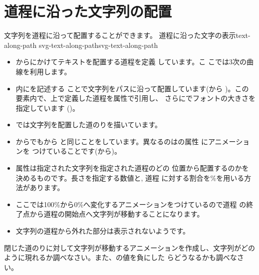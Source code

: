 \section{道程に沿った文字列の配置}
文字列を道程に沿って配置することができます。
    {道程に沿った文字の表示}{text-along-path}
{}
{svg-text-along-path}{svg-text-along-path}
\begin{itemize}
 \item {}からにかけてテキストを配置する道程を定義
       しています。こ
       こでは3次の\Bezier 曲線を利用します。
 \item {}内にを記述する
       ことで文字列をパスに沿って配置しています(から
       )。この要素内で、上で定義した道程を属性で引用し、
       さらにでフォントの大きさを指定しています
       ()。
 \item {}では文字列を配置した道のりを描いています。
 \item {}からでもから
       と同じことをしています。異なるのはの属性
       にアニメーションを
       つけていることです(から)。
 \item 属性は指定された文字列を指定された道程のどの
       位置から配置するのかを決めるものです。長さを指定する数値と, 道程
       に対する割合を\%を用いる方法があります。
 \item ここでは100\%から0\%へ変化するアニメーションをつけているので道程
       の終了点から道程の開始点へ文字列が移動することになります。
 \item 文字列の道程から外れた部分は表示されないようです。
\end{itemize}
\begin{Problem}
閉じた道のりに対して文字列が移動するアニメーションを作成し、文字列がどの
 ように現れるか調べなさい。また、の値を負にした
 らどうなるかも調べなさい。
\end{Problem}
\ifSeminor
\else
